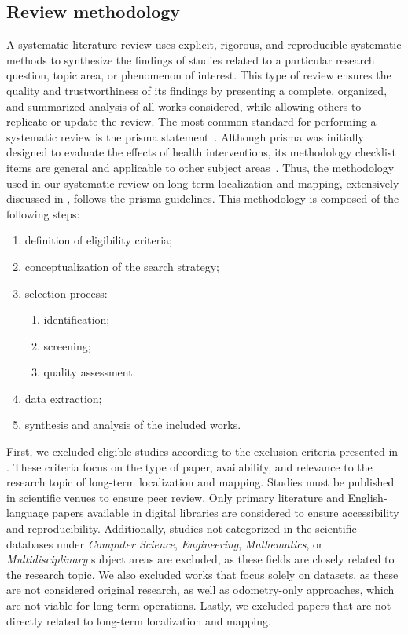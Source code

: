 \subsection{Review methodology}\label{sec:literature:systematic:method}
A systematic literature review uses explicit, rigorous, and
reproducible systematic methods to synthesize the findings of studies related
to a particular research question, topic area, or phenomenon of interest.
This type of review ensures the quality and trustworthiness of its findings
by presenting a complete, organized, and summarized analysis of all works
considered, while allowing others to replicate or update the review.
The most common standard for performing a systematic review is the \gls{prisma}
statement~\cite{page:bmj:2021}.
Although \gls{prisma} was initially designed to evaluate the effects of health
interventions, its methodology checklist items are general and applicable
to other subject areas~\cite{benos:sensors:2021,chukwu-garg:access:2020,moayedi:nca:2020,qureshi:ijim:2020,qureshi:ijim:2020}.
Thus, the methodology used in our systematic review on long-term localization
and mapping, extensively discussed in , follows the
\gls{prisma} guidelines. This methodology is composed of the following steps:
\begin{enumerate}
\item definition of eligibility criteria;
\item conceptualization of the search strategy;
\item selection process:
  \begin{enumerate}
  \item identification;
  \item screening;
  \item quality assessment.
  \end{enumerate}
\item data extraction;
\item synthesis and analysis of the included works.
\end{enumerate}

First, we excluded eligible studies according to the exclusion criteria
presented in .
These criteria focus on the type of paper, availability, and relevance to the
research topic of long-term localization and mapping.
Studies must be published in scientific venues to ensure peer review.
Only primary literature and English-language papers available in digital
libraries are considered to ensure accessibility and reproducibility.
Additionally, studies not categorized in the scientific databases under
\textit{Computer Science}, \textit{Engineering}, \textit{Mathematics}, or
\textit{Multidisciplinary} subject areas
are excluded, as these fields are closely related to the research topic.
We also excluded works that focus solely on datasets, as these are not
considered original research, as well as odometry-only approaches,
which are not viable for long-term operations.
Lastly, we excluded papers that are not directly related to
long-term localization and mapping.

